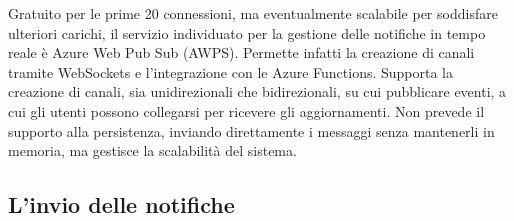 Gratuito per le prime 20 connessioni, 
ma eventualmente scalabile per soddisfare ulteriori carichi, 
il servizio individuato per la gestione delle notifiche in tempo reale è Azure Web Pub Sub (AWPS). 
Permette infatti la creazione di canali tramite WebSockets e l'integrazione con le Azure Functions. 
Supporta la creazione di canali, sia unidirezionali che bidirezionali, su cui pubblicare eventi, 
a cui gli utenti possono collegarsi per ricevere gli aggiornamenti. 
Non prevede il supporto alla persistenza, 
inviando direttamente i messaggi senza mantenerli in memoria,
ma gestisce la scalabilità del sistema.\\

\subsection{L'invio delle notifiche}

